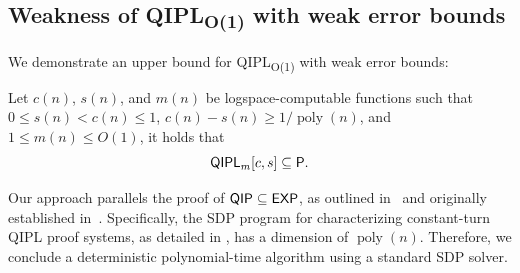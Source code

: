 \documentclass[10pt,a4paper]{article}
\numberwithin{equation}{section}
\numberwithin{figure}{section}
\newcommand{\Ptime}{\textnormal{\textsf{P}}\xspace}
\newcommand{\EXP}{\textnormal{\textsf{EXP}}\xspace}
\newcommand{\QIP}{\textnormal{\textsf{QIP}}\xspace}
\newcommand{\QIPL}{\textnormal{\textsf{QIPL}}\xspace}
\newcommand{\QIPLconst}{\texorpdfstring{\textnormal{\textsf{QIPL}\textsubscript{O(1)}}}\xspace}
\DeclareMathOperator\poly{poly}
\begin{document}
\subsection{Weakness of \QIPLconst{} with weak error bounds}
\label{subsec:QIPLconst-weakErrorBound-in-P}

We demonstrate an upper bound for \QIPLconst{} with weak error bounds: 
\begin{lemma}[\QIPLconst{} is in \Ptime{}]
    \label{lemma:QIPLconst-in-P}
    Let $c(n)$, $s(n)$, and $m(n)$ be logspace-computable functions such that $0 \leq s(n) < c(n) \leq 1$, $c(n) - s(n) \geq 1/\poly(n)$, and $1 \leq m(n) \leq O(1)$, it holds that 
    \[\QIPL_m[c,s] \subseteq \Ptime.\]
\end{lemma}

Our approach parallels the proof of $\QIP \subseteq \EXP$, as outlined in~\cite[Page 31]{Watrous16tutorial} and originally established in~\cite[Section 6]{KW00}. Specifically, the SDP program for characterizing constant-turn \QIPL{} proof systems, as detailed in , has a dimension of $\poly(n)$. Therefore, we conclude a deterministic polynomial-time algorithm using a standard SDP solver. 
\end{document}
